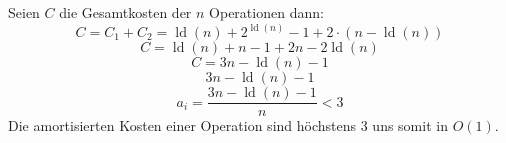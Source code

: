 \documentclass{article}
\begin{document}
Seien $C$ die Gesamtkosten der $n$ Operationen dann:
\begin{equation}
C=C_1+C_2={\operatorname{ld}(n)}+2^{\operatorname{ld}(n)}-1+2 \cdot ({n-\operatorname{ld}(n)})
\end{equation}
\begin{equation}
C={\operatorname{ld}(n)}+n-1+2 n-2{\operatorname{ld}(n)}
\end{equation}
\begin{equation}
C=3n-{\operatorname{ld}(n)}-1
\end{equation}
\begin{equation}
3n-{\operatorname{ld}(n)}-1
\end{equation}
\begin{equation}
a_i=\frac{3n-{\operatorname{ld}(n)}-1}{n} < 3
\end{equation}
Die amortisierten Kosten einer Operation sind höchstens $3$ uns somit in $O(1)$.
\newpage
\end{document}

